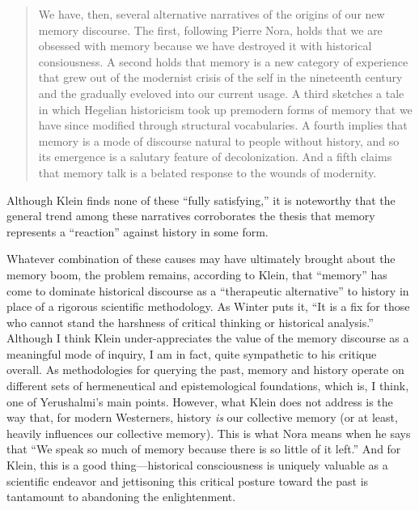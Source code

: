 \begin{quote}
We have, then, several alternative narratives of the origins of our new
memory discourse. The first, following Pierre Nora, holds that we are
obsessed with memory because we have destroyed it with historical
consiousness. A second holds that memory is a new category of experience
that grew out of the modernist crisis of the self in the nineteenth
century and the gradually eveloved into our current usage. A third
sketches a tale in which Hegelian historicism took up premodern forms of
memory that we have since modified through structural vocabularies. A
fourth implies that memory is a mode of discourse natural to people
without history, and so its emergence is a salutary feature of
decolonization. And a fifth claims that memory talk is a belated
response to the wounds of modernity.\autocite[134]{klein_klein2011}
\end{quote}

Although Klein finds none of these ``fully satisfying,'' it is
noteworthy that the general trend among these narratives corroborates
the thesis that memory represents a ``reaction'' against history in some
form.

Whatever combination of these causes may have ultimately brought about
the memory boom, the problem remains, according to Klein, that
``memory'' has come to dominate historical discourse as a ``therapeutic
alternative'' to history in place of a rigorous scientific
methodology.\autocite[137]{klein2011} As Winter puts it, ``It is a fix
for those who cannot stand the harshness of critical thinking or
historical analysis.''\autocite[283]{winter2006} Although I think Klein
under-appreciates the value of the memory discourse as a meaningful mode
of inquiry, I am in fact, quite sympathetic to his critique overall. As
methodologies for querying the past, memory and history operate on
different sets of hermeneutical and epistemological foundations, which
is, I think, one of Yerushalmi's main points. However, what Klein does
not address is the way that, for modern Westerners, history \emph{is}
our collective memory (or at least, heavily influences our collective
memory). This is what Nora means when he says that ``We speak so much of
memory because there is so little of it
left.''\autocite[7]{nora_representations1989} And for Klein, this is a
good thing---historical consciousness is uniquely valuable as a
scientific endeavor and jettisoning this critical posture toward the
past is tantamount to abandoning the enlightenment.

